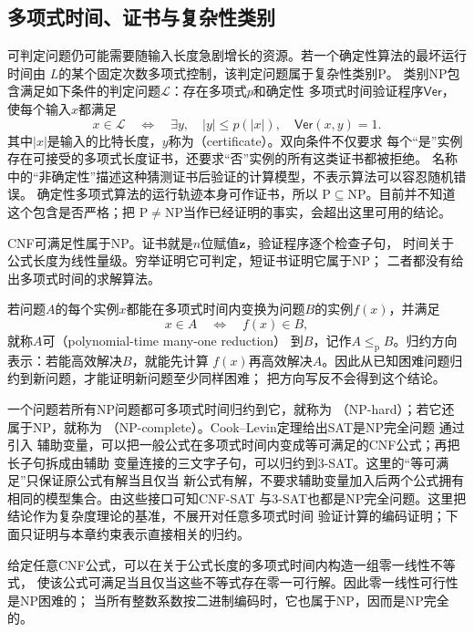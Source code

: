 \subsection{多项式时间、证书与复杂性类别}

可判定问题仍可能需要随输入长度急剧增长的资源。若一个确定性算法的最坏运行时间由
$L$的某个固定次数多项式控制，该判定问题属于复杂性类别$\mathrm{P}$。
类别$\mathrm{NP}$包含满足如下条件的判定问题$\mathcal{L}$：存在多项式$p$和确定性
多项式时间验证程序$\mathsf{Ver}$，使每个输入$x$都满足
\[
  x\in\mathcal{L}
  \quad\Longleftrightarrow\quad
  \exists y,\quad |y|\leq p(|x|),\quad \mathsf{Ver}(x,y)=1.
\]
其中$|x|$是输入的比特长度，$y$称为（certificate）。双向条件不仅要求
每个“是”实例存在可接受的多项式长度证书，还要求“否”实例的所有这类证书都被拒绝。
名称中的“非确定性”描述这种猜测证书后验证的计算模型，不表示算法可以容忍随机错误。
确定性多项式算法的运行轨迹本身可作证书，所以
$\mathrm{P}\subseteq\mathrm{NP}$。目前并不知道这个包含是否严格；把
$\mathrm{P}\neq\mathrm{NP}$当作已经证明的事实，会超出这里可用的结论。

CNF可满足性属于$\mathrm{NP}$。证书就是$n$位赋值$\bm{z}$，验证程序逐个检查子句，
时间关于公式长度为线性量级。穷举证明它可判定，短证书证明它属于$\mathrm{NP}$；
二者都没有给出多项式时间的求解算法。

若问题$A$的每个实例$x$都能在多项式时间内变换为问题$B$的实例$f(x)$，并满足
\[
  x\in A\quad\Longleftrightarrow\quad f(x)\in B,
\]
就称$A$可（polynomial-time many-one reduction）
到$B$，记作$A\leq_{\mathrm{p}}B$。归约方向表示：若能高效解决$B$，就能先计算
$f(x)$再高效解决$A$。因此从已知困难问题归约到新问题，才能证明新问题至少同样困难；
把方向写反不会得到这个结论。

一个问题若所有$\mathrm{NP}$问题都可多项式时间归约到它，就称为
（NP-hard）；若它还属于$\mathrm{NP}$，就称为
（NP-complete）。Cook--Levin定理给出SAT是NP完全问题
通过引入
辅助变量，可以把一般公式在多项式时间内变成等可满足的CNF公式；再把长子句拆成由辅助
变量连接的三文字子句，可以归约到3-SAT。这里的“等可满足”只保证原公式有解当且仅当
新公式有解，不要求辅助变量加入后两个公式拥有相同的模型集合。由这些接口可知CNF-SAT
与3-SAT也都是NP完全问题。这里把结论作为复杂度理论的基准，不展开对任意多项式时间
验证计算的编码证明；下面只证明与本章约束表示直接相关的归约。

\begin{theorem}[CNF可满足性归约到零一线性可行性]
\label{thm:comb-sat-to-binary-linear}
给定任意CNF公式，可以在关于公式长度的多项式时间内构造一组零一线性不等式，
使该公式可满足当且仅当这些不等式存在零一可行解。因此零一线性可行性是NP困难的；
当所有整数系数按二进制编码时，它也属于NP，因而是NP完全的。
\end{theorem}


